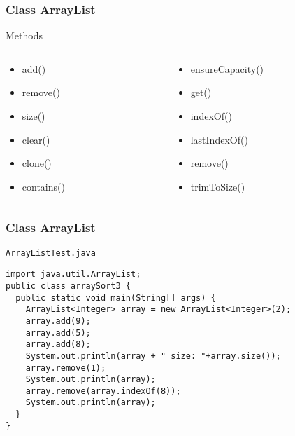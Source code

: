 \documentclass[10pt, compress]{beamer}
\begin{document}
\begin{frame}[fragile]
  \frametitle{Class ArrayList}
  \begin{block}{Methods}
    \begin{columns}
      \begin{column}{0.5\textwidth}
        \begin{itemize}
          \item[] add()
          \item[] remove()
          \item[] size()
          \item[] clear()
          \item[] clone()
          \item[] contains()
        \end{itemize}
      \end{column}
      \begin{column}{0.5\textwidth}
        \begin{itemize}
          \item[] ensureCapacity()
          \item[] get()
          \item[] indexOf()
          \item[] lastIndexOf()
          \item[] remove()
          \item[] trimToSize()
        \end{itemize}
      \end{column}
    \end{columns}
  \end{block}
\end{frame}

\begin{frame}[fragile]
  \frametitle{Class ArrayList}
  \begin{block}{\texttt{ArrayListTest.java}}
    \begin{verbatim}
import java.util.ArrayList;
public class arraySort3 {
  public static void main(String[] args) {
    ArrayList<Integer> array = new ArrayList<Integer>(2);
    array.add(9);
    array.add(5);
    array.add(8);
    System.out.println(array + " size: "+array.size());
    array.remove(1);
    System.out.println(array);
    array.remove(array.indexOf(8));
    System.out.println(array);
  }
}
    \end{verbatim}
  \end{block}
\end{frame}

\end{document}
